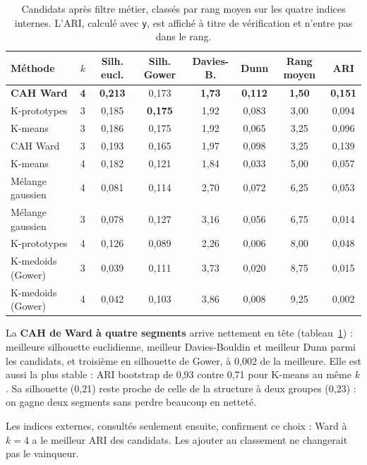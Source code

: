 \documentclass[11pt,a4paper]{article}
\begin{document}
\begin{table}[H]\centering\small
\caption{Candidats après filtre métier, classés par rang moyen sur les quatre indices internes. L'ARI, calculé avec \texttt{y}, est affiché à titre de vérification et n'entre pas dans le rang.}\label{tab:synthese}
\begin{tabular}{|l|c|c|c|c|c|c|c|}
\hline
\textbf{Méthode} & $k$ & \textbf{Silh. eucl.} & \textbf{Silh. Gower} & \textbf{Davies-B.} & \textbf{Dunn} & \textbf{Rang moyen} & \textbf{ARI}\\ \hline
\textbf{CAH Ward}  & \textbf{4} & \textbf{0,213} & 0,173 & \textbf{1,73} & \textbf{0,112} & \textbf{1,50} & \textbf{0,151}\\ \hline
K-prototypes       & 3 & 0,185 & \textbf{0,175} & 1,92 & 0,083 & 3,00 & 0,094\\ \hline
K-means            & 3 & 0,186 & 0,175 & 1,92 & 0,065 & 3,25 & 0,096\\ \hline
CAH Ward           & 3 & 0,193 & 0,165 & 1,97 & 0,098 & 3,25 & 0,139\\ \hline
K-means            & 4 & 0,182 & 0,121 & 1,84 & 0,033 & 5,00 & 0,057\\ \hline
Mélange gaussien   & 4 & 0,081 & 0,114 & 2,70 & 0,072 & 6,25 & 0,053\\ \hline
Mélange gaussien   & 3 & 0,078 & 0,127 & 3,16 & 0,056 & 6,75 & 0,014\\ \hline
K-prototypes       & 4 & 0,126 & 0,089 & 2,26 & 0,006 & 8,00 & 0,048\\ \hline
K-medoids (Gower)  & 3 & 0,039 & 0,111 & 3,73 & 0,020 & 8,75 & 0,015\\ \hline
K-medoids (Gower)  & 4 & 0,042 & 0,103 & 3,86 & 0,008 & 9,25 & 0,002\\ \hline
\end{tabular}
\end{table}

La \textbf{CAH de Ward à quatre segments} arrive nettement en tête (tableau~\ref{tab:synthese}) : meilleure silhouette euclidienne, meilleur Davies-Bouldin et meilleur Dunn parmi les candidats, et troisième en silhouette de Gower, à 0,002 de la meilleure. Elle est aussi la plus stable : ARI bootstrap de 0,93 contre 0,71 pour K-means au même $k$. Sa silhouette (0,21) reste proche de celle de la structure à deux groupes (0,23) : on gagne deux segments sans perdre beaucoup en netteté.

Les indices externes, consultés seulement ensuite, confirment ce choix : Ward à $k=4$ a le meilleur ARI des candidats. Les ajouter au classement ne changerait pas le vainqueur.
\end{document}
